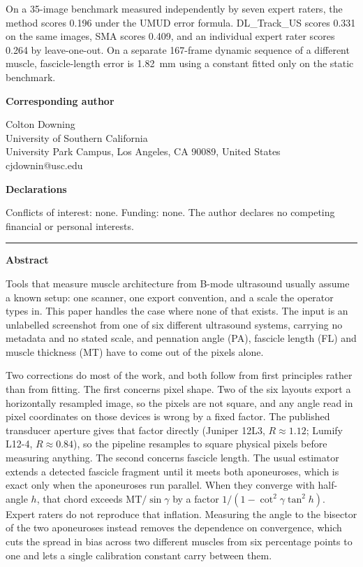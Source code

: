 \documentclass[11pt]{article}
\begin{document}
On a 35-image benchmark measured independently by seven expert raters, the
method scores 0.196 under the UMUD error formula. DL\_Track\_US scores 0.331 on
the same images, SMA scores 0.409, and an individual expert rater scores 0.264
by leave-one-out. On a separate 167-frame dynamic sequence of a different
muscle, fascicle-length error is 1.82~mm using a constant fitted only on the
static benchmark.

\vspace{1.2em}

\noindent\textbf{Corresponding author}
\vspace{0.4em}

\noindent Colton Downing\\
University of Southern California\\
University Park Campus, Los Angeles, CA 90089, United States\\
cjdownin@usc.edu
\vspace{1.2em}

\noindent\textbf{Declarations}
\vspace{0.4em}

\noindent Conflicts of interest: none. Funding: none. The author declares no competing
financial or personal interests.
\vspace{1.5em}

\hrule
\vspace{1.5em}

\noindent\textbf{\large Abstract}
\vspace{0.8em}

\noindent Tools that measure muscle architecture from B-mode ultrasound usually assume a
known setup: one scanner, one export convention, and a scale the operator types
in. This paper handles the case where none of that exists. The input is an
unlabelled screenshot from one of six different ultrasound systems, carrying no
metadata and no stated scale, and pennation angle (PA), fascicle length (FL) and
muscle thickness (MT) have to come out of the pixels alone.

\vspace{0.6em}
\noindent Two corrections do most of the work, and both follow from first principles
rather than from fitting. The first concerns pixel shape. Two of the six layouts
export a horizontally resampled image, so the pixels are not square, and any
angle read in pixel coordinates on those devices is wrong by a fixed factor. The
published transducer aperture gives that factor directly (Juniper 12L3,
$R \approx 1.12$; Lumify L12-4, $R \approx 0.84$), so the pipeline resamples to
square physical pixels before measuring anything. The second concerns fascicle
length. The usual estimator extends a detected fascicle fragment until it meets
both aponeuroses, which is exact only when the aponeuroses run parallel. When
they converge with half-angle $h$, that chord exceeds $\mathrm{MT}/\sin\gamma$
by a factor $1/(1-\cot^{2}\gamma\tan^{2}h)$. Expert raters do not reproduce that
inflation. Measuring the angle to the bisector of the two aponeuroses instead
removes the dependence on convergence, which cuts the spread in bias across two
different muscles from six percentage points to one and lets a single
calibration constant carry between them.
\end{document}
